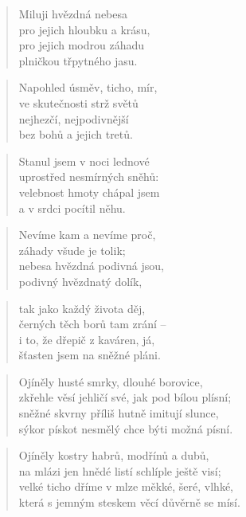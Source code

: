\documentclass{book}
\begin{document}
\newpage
{}
\begin{verse}
\large{}
\end{verse}
\begin{verse}
Miluji hvězdná nebesa\\
pro jejich hloubku a krásu,\\
pro jejich modrou záhadu\\
plničkou třpytného jasu.
\end{verse}
\begin{verse}
Napohled úsměv, ticho, mír,\\
ve skutečnosti strž světů\\
nejhezčí, nejpodivnější\\
bez bohů a jejich tretů.
\end{verse}
\begin{verse}
Stanul jsem v noci lednové\\
uprostřed nesmírných sněhů:\\
velebnost hmoty chápal jsem\\
a v srdci pocítil něhu.
\end{verse}
\begin{verse}
\large{}
\end{verse}
\begin{verse}
Nevíme kam a nevíme proč,\\
záhady všude je tolik;\\
nebesa hvězdná podivná jsou,\\
podivný hvězdnatý dolík,
\end{verse}
\begin{verse}
tak jako každý života děj,\\
černých těch borů tam zrání --\\
i to, že dřepič z kaváren, já,\\
šťasten jsem na sněžné pláni.
\end{verse}
\newpage
{}
\begin{verse}
Ojíněly husté smrky, dlouhé borovice,\\
zkřehle věsí jehličí své, jak pod bílou plísní;\\
sněžné skvrny příliš hutně imitují slunce,\\
sýkor pískot nesmělý chce býti možná písní.
\end{verse}
\begin{verse}
Ojíněly kostry habrů, modřínů a dubů,\\
na mlázi jen hnědé listí schlíple ještě visí;\\
velké ticho dříme v mlze měkké, šeré, vlhké,\\
která s jemným steskem věcí důvěrně se mísí.
\end{verse}
\end{document}
